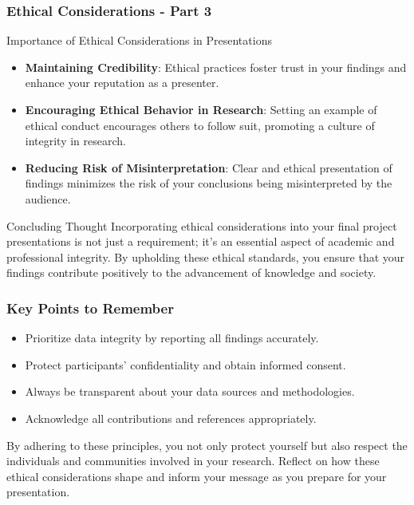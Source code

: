 \documentclass[aspectratio=169]{beamer}
\begin{document}
\begin{frame}[fragile]
    \frametitle{Ethical Considerations - Part 3}
    \begin{block}{Importance of Ethical Considerations in Presentations}
        \begin{itemize}
            \item \textbf{Maintaining Credibility}:
                Ethical practices foster trust in your findings and enhance your reputation as a presenter.
            \item \textbf{Encouraging Ethical Behavior in Research}:
                Setting an example of ethical conduct encourages others to follow suit, promoting a culture of integrity in research.
            \item \textbf{Reducing Risk of Misinterpretation}:
                Clear and ethical presentation of findings minimizes the risk of your conclusions being misinterpreted by the audience.
        \end{itemize}
    \end{block}
    
    \begin{block}{Concluding Thought}
        Incorporating ethical considerations into your final project presentations is not just a requirement; it's an essential aspect of academic and professional integrity. By upholding these ethical standards, you ensure that your findings contribute positively to the advancement of knowledge and society.
    \end{block}
\end{frame}

\begin{frame}[fragile]
    \frametitle{Key Points to Remember}
    \begin{itemize}
        \item Prioritize data integrity by reporting all findings accurately.
        \item Protect participants' confidentiality and obtain informed consent.
        \item Always be transparent about your data sources and methodologies.
        \item Acknowledge all contributions and references appropriately.
    \end{itemize}
    
    By adhering to these principles, you not only protect yourself but also respect the individuals and communities involved in your research. Reflect on how these ethical considerations shape and inform your message as you prepare for your presentation.
\end{frame}
\end{document}
